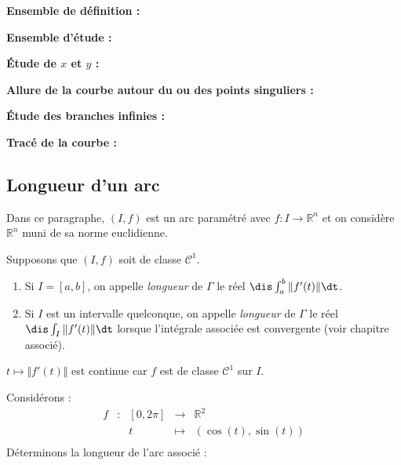 \documentclass[a4paper,10pt]{report}
\begin{document}
\noindent \textbf{Ensemble de définition :}

\vspace{1cm}

\noindent \textbf{Ensemble d'étude :}

\vspace{2cm}

\newpage
\noindent \textbf{Étude de $x$ et $y$ :}

\vspace{12cm}


\noindent \textbf{Allure de la courbe autour du ou des points singuliers : }

\vspace{6cm}

\noindent \textbf{Étude des branches infinies :}

\vspace{7cm}

\newpage
\noindent \textbf{Tracé de la courbe :}

\vspace{6cm}



\subsection{Longueur d'un arc}
\noindent Dans ce paragraphe, $(I,f)$ est un arc paramétré avec $f : I \rightarrow \mathbb{R}^n$ et on considère $\mathbb{R}^n$ muni de sa norme euclidienne.

\begin{defin} Supposons que $(I,f)$ soit de classe $\mathcal{C}^1$. 

\begin{enumerate}
\item Si $I=[a,b]$, on appelle \textit{longueur} de $\Gamma$ le réel $\dis \int_{a}^b \Vert f'(t) \Vert \dt$.
\item Si $I$ est un intervalle quelconque, on appelle \textit{longueur} de $\Gamma$ le réel $\dis \int_{I} \Vert f'(t) \Vert \dt$ lorsque l'intégrale associée est convergente (voir chapitre associé).
\end{enumerate}
\end{defin}

\begin{rem} $t \mapsto \Vert f'(t) \Vert$ est continue car $f$ est de classe $\mathcal{C}^1$ sur $I$.
\end{rem}


\begin{ex} Considérons : $$ \begin{array}{ccccl}
f & : & [0,2 \pi] & \rightarrow & \mathbb{R}^2 \\
 & & t & \mapsto & (\cos(t), \sin(t)) \\
\end{array}$$
Déterminons la longueur de l'arc associé :

\vspace{4cm}
\end{ex}
\end{document}
